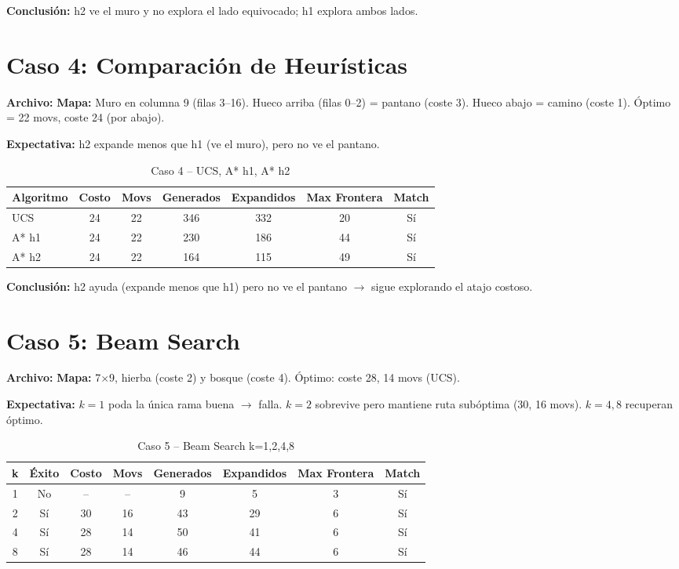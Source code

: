 \textbf{Conclusión:} h2 ve el muro y no explora el lado equivocado; h1 explora ambos lados.

\section{Caso 4: Comparación de Heurísticas}
\label{sec:caso4-detalle}

\textbf{Archivo:} 
\textbf{Mapa:} Muro en columna 9 (filas 3--16). Hueco arriba (filas 0--2) = pantano (coste 3).
Hueco abajo = camino (coste 1). Óptimo = 22 movs, coste 24 (por abajo).

\textbf{Expectativa:} h2 expande menos que h1 (ve el muro), pero no ve el pantano.

\begin{table}[H]
\centering
\caption{Caso 4 -- UCS, A* h1, A* h2}
\begin{tabular}{lcccccc}
\toprule
Algoritmo & Costo & Movs & Generados & Expandidos & Max Frontera & Match \\
\midrule
UCS & 24 & 22 & 346 & 332 & 20 & Sí \\
A* h1 & 24 & 22 & 230 & 186 & 44 & Sí \\
A* h2 & 24 & 22 & 164 & 115 & 49 & Sí \\
\bottomrule
\end{tabular}
\end{table}

\textbf{Conclusión:} h2 ayuda (expande menos que h1) pero no ve el pantano $\to$ sigue
explorando el atajo costoso.

\section{Caso 5: Beam Search}
\label{sec:caso5-detalle}

\textbf{Archivo:} 
\textbf{Mapa:} 7$\times$9, hierba (coste 2) y bosque (coste 4). Óptimo: coste 28, 14 movs (UCS).

\textbf{Expectativa:} $k=1$ poda la única rama buena $\to$ falla. $k=2$ sobrevive pero mantiene
ruta subóptima (30, 16 movs). $k=4,8$ recuperan óptimo.

\begin{table}[H]
\centering
\caption{Caso 5 -- Beam Search k=1,2,4,8}
\begin{tabular}{cccccccc}
\toprule
k & Éxito & Costo & Movs & Generados & Expandidos & Max Frontera & Match \\
\midrule
1 & No & -- & -- & 9 & 5 & 3 & Sí \\
2 & Sí & 30 & 16 & 43 & 29 & 6 & Sí \\
4 & Sí & 28 & 14 & 50 & 41 & 6 & Sí \\
8 & Sí & 28 & 14 & 46 & 44 & 6 & Sí \\
\bottomrule
\end{tabular}
\end{table}

